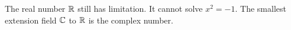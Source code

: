 The real number $\mathbb{R}$ still has limitation. It cannot solve $x^2 = -1$. The smallest extension field $\mathbb{C}$ to $\mathbb{R}$ is the complex number.


















































































































